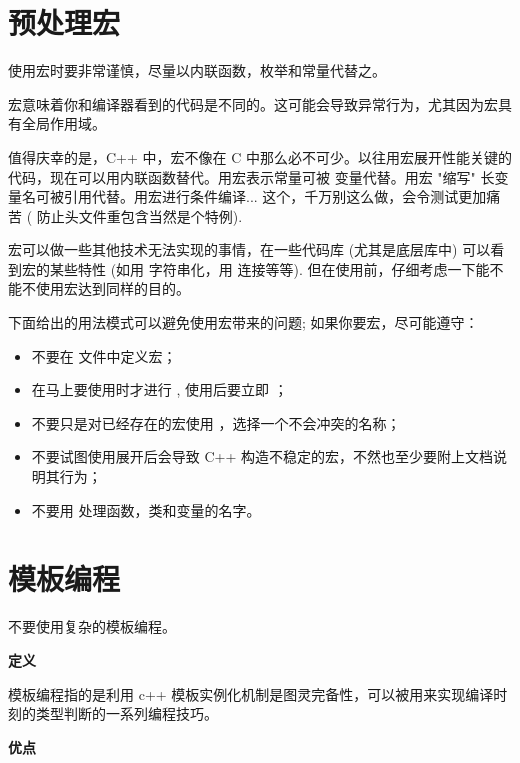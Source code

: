 \section{预处理宏} \label{qt-preprocessor-macros}

\begin{DNote}
  使用宏时要非常谨慎，尽量以内联函数，枚举和常量代替之。
\end{DNote}

宏意味着你和编译器看到的代码是不同的。这可能会导致异常行为，尤其因为宏具有全局作用域。

值得庆幸的是，C++ 中，宏不像在 C 中那么必不可少。以往用宏展开性能关键的代码，现在可以用内联函数替代。用宏表示常量可被  变量代替。用宏 "缩写" 长变量名可被引用代替。用宏进行条件编译... 这个，千万别这么做，会令测试更加痛苦 (  防止头文件重包含当然是个特例).

宏可以做一些其他技术无法实现的事情，在一些代码库 (尤其是底层库中) 可以看到宏的某些特性 (如用 \cppinline{#} 字符串化，用 \cppinline{##} 连接等等). 但在使用前，仔细考虑一下能不能不使用宏达到同样的目的。

下面给出的用法模式可以避免使用宏带来的问题; 如果你要宏，尽可能遵守：

\begin{itemize}
  \item 不要在  文件中定义宏；
  \item 在马上要使用时才进行 , 使用后要立即 ；
  \item 不要只是对已经存在的宏使用 ，选择一个不会冲突的名称；
  \item 不要试图使用展开后会导致 C++ 构造不稳定的宏，不然也至少要附上文档说明其行为；
  \item 不要用 \cppinline{##} 处理函数，类和变量的名字。
\end{itemize}

\section{模板编程} \label{qt-template-metaprogramming}

\begin{DNote}
不要使用复杂的模板编程。
\end{DNote}

\textbf{定义}

模板编程指的是利用 c++ 模板实例化机制是图灵完备性，可以被用来实现编译时刻的类型判断的一系列编程技巧。

\textbf{优点}

